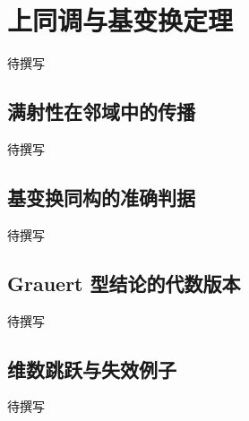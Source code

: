 
% 
% 

\section{上同调与基变换定理}
\label{g5:sec:2004}

待撰写

\subsection{满射性在邻域中的传播}
\label{g5:subsec:2004:01}
待撰写

\subsection{基变换同构的准确判据}
\label{g5:subsec:2004:02}
待撰写

\subsection{Grauert 型结论的代数版本}
\label{g5:subsec:2004:03}
待撰写

\subsection{维数跳跃与失效例子}
\label{g5:subsec:2004:04}
待撰写
